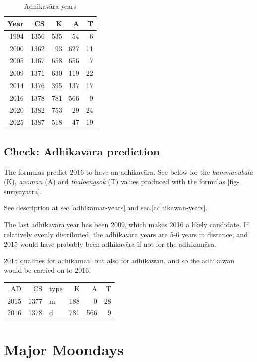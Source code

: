 \documentclass[11pt,oneside]{memoir-article}
\begin{document}
\begin{table}[p]
\caption{\label{tbl-cycle-adhikavara} Adhikavāra years}
\centering
\begin{tabular}{rrrrr}
Year & CS & K & A & T\\
\hline
1994 & 1356 & 535 & 54 & 6\\
2000 & 1362 & 93 & 627 & 11\\
2005 & 1367 & 658 & 656 & 7\\
2009 & 1371 & 630 & 119 & 22\\
2014 & 1376 & 395 & 137 & 17\\
2016 & 1378 & 781 & 566 & 9\\
2020 & 1382 & 753 & 29 & 24\\
2025 & 1387 & 518 & 47 & 19\\
\end{tabular}
\end{table}

\subsection{Check: Adhikavāra prediction}
\label{sec-2-2-1}
\label{adhikavara-prediction}

The formulas predict 2016 to have an adhikavāra. See below for the
\emph{kammacubala} (K), \emph{avoman} (A) and \emph{thaloengsok} (T) values produced
with the formulas \ref{fig-suriyayatra}.

See description at sec.\ref{adhikamat-years} and
sec.\ref{adhikawan-years}.

The last adhikavāra year has been 2009, which makes 2016 a likely
candidate. If relatively evenly distributed, the adhikavāra years are
5-6 years in distance, and 2015 would have probably been adhikavāra if
not for the adhikamāsa.

2015 qualifies for adhikamat, but also for adhikawan, and so the
adhikawan would be carried on to 2016.

\begin{center}
\begin{tabular}{rrlrrr}
AD & CS & type & K & A & T\\
2015 & 1377 & m & 188 & 0 & 28\\
2016 & 1378 & d & 781 & 566 & 9\\
\end{tabular}
\end{center}

\section{Major Moondays}
\label{sec-2-3}
\label{major-moondays}
\end{document}
